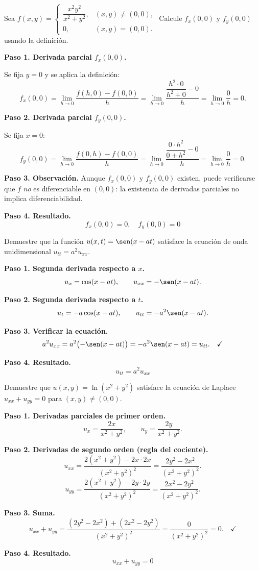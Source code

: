 \begin{prob}
Sea $f(x,y)=\begin{cases}
\dfrac{x^2 y^2}{x^2+y^2}, & (x,y)\neq(0,0),\\
0, & (x,y)=(0,0).
\end{cases}$
Calcule $f_x(0,0)$ y $f_y(0,0)$ usando la definición.
\begin{myproof}
\textbf{Paso 1. Derivada parcial $f_x(0,0)$.}

Se fija $y=0$ y se aplica la definición:
\[
f_x(0,0)=\lim_{h\to 0}\frac{f(h,0)-f(0,0)}{h}
=\lim_{h\to 0}\frac{\dfrac{h^2\cdot 0}{h^2+0}-0}{h}
=\lim_{h\to 0}\frac{0}{h}=0.
\]

\textbf{Paso 2. Derivada parcial $f_y(0,0)$.}

Se fija $x=0$:
\[
f_y(0,0)=\lim_{h\to 0}\frac{f(0,h)-f(0,0)}{h}
=\lim_{h\to 0}\frac{\dfrac{0\cdot h^2}{0+h^2}-0}{h}
=\lim_{h\to 0}\frac{0}{h}=0.
\]

\textbf{Paso 3. Observación.}
Aunque $f_x(0,0)$ y $f_y(0,0)$ existen, puede verificarse que $f$ \emph{no} es diferenciable en $(0,0)$: la existencia de derivadas parciales no implica diferenciabilidad.

\textbf{Paso 4. Resultado.}
\[
\boxed{f_x(0,0)=0,\quad f_y(0,0)=0}
\]
\end{myproof}
\end{prob}

\begin{prob}
Demuestre que la función $u(x,t)=\sen(x-at)$ satisface la ecuación de
onda unidimensional $u_{tt}=a^2 u_{xx}$.
\begin{myproof}
\textbf{Paso 1. Segunda derivada respecto a $x$.}
\[
u_x = \cos(x-at),\qquad u_{xx} = -\sen(x-at).
\]

\textbf{Paso 2. Segunda derivada respecto a $t$.}
\[
u_t = -a\cos(x-at),\qquad u_{tt} = -a^2\sen(x-at).
\]

\textbf{Paso 3. Verificar la ecuación.}
\[
a^2 u_{xx} = a^2\bigl(-\sen(x-at)\bigr) = -a^2\sen(x-at) = u_{tt}.\quad\checkmark
\]

\textbf{Paso 4. Resultado.}
\[
\boxed{u_{tt}=a^2 u_{xx}}
\]
\end{myproof}
\end{prob}

\begin{prob}
Demuestre que $u(x,y)=\ln(x^2+y^2)$ satisface la ecuación de Laplace
$u_{xx}+u_{yy}=0$ para $(x,y)\neq(0,0)$.
\begin{myproof}
\textbf{Paso 1. Derivadas parciales de primer orden.}
\[
u_x=\frac{2x}{x^2+y^2},\qquad u_y=\frac{2y}{x^2+y^2}.
\]

\textbf{Paso 2. Derivadas de segundo orden (regla del cociente).}
\[
u_{xx}=\frac{2(x^2+y^2)-2x\cdot 2x}{(x^2+y^2)^2}
=\frac{2y^2-2x^2}{(x^2+y^2)^2}.
\]
\[
u_{yy}=\frac{2(x^2+y^2)-2y\cdot 2y}{(x^2+y^2)^2}
=\frac{2x^2-2y^2}{(x^2+y^2)^2}.
\]

\textbf{Paso 3. Suma.}
\[
u_{xx}+u_{yy}
=\frac{(2y^2-2x^2)+(2x^2-2y^2)}{(x^2+y^2)^2}
=\frac{0}{(x^2+y^2)^2}=0.\quad\checkmark
\]

\textbf{Paso 4. Resultado.}
\[
\boxed{u_{xx}+u_{yy}=0}
\]
\end{myproof}
\end{prob}

